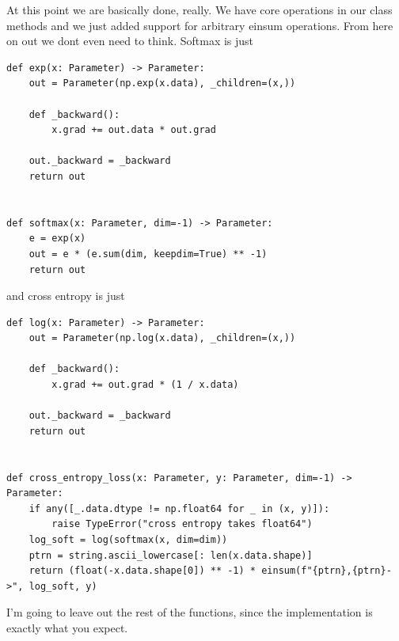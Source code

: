 \documentclass[11pt]{article}
\begin{document}
\par At this point we are basically done, really. We have core operations in our  class methods and 
we just added support for arbitrary einsum operations. From here on out we dont even need to think. Softmax is just 
\begin{verbatim}
def exp(x: Parameter) -> Parameter:
    out = Parameter(np.exp(x.data), _children=(x,))

    def _backward():
        x.grad += out.data * out.grad

    out._backward = _backward
    return out


def softmax(x: Parameter, dim=-1) -> Parameter:
    e = exp(x)
    out = e * (e.sum(dim, keepdim=True) ** -1)
    return out
\end{verbatim}
 and cross entropy is just
 \begin{verbatim}
def log(x: Parameter) -> Parameter:
    out = Parameter(np.log(x.data), _children=(x,))

    def _backward():
        x.grad += out.grad * (1 / x.data)

    out._backward = _backward
    return out


def cross_entropy_loss(x: Parameter, y: Parameter, dim=-1) -> Parameter:
    if any([_.data.dtype != np.float64 for _ in (x, y)]):
        raise TypeError("cross entropy takes float64")
    log_soft = log(softmax(x, dim=dim))
    ptrn = string.ascii_lowercase[: len(x.data.shape)]
    return (float(-x.data.shape[0]) ** -1) * einsum(f"{ptrn},{ptrn}->", log_soft, y)
 \end{verbatim}
 I'm going to leave out the rest of the functions, since the implementation is exactly what you expect. 
\end{document}
